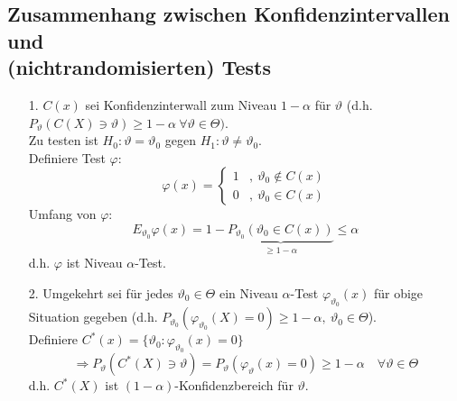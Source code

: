 \documentclass[a4paper,11pt,twoside,titlepage]{article}
\begin{document}
\subsection{Zusammenhang zwischen Konfidenzintervallen und\\ (nichtrandomisierten) Tests}%
\begin{itemize}
\item[1. ]$C(x)$ sei Konfidenzinterwall zum Niveau $1-\alpha$ für $\vartheta$ (d.h.\\ $P_\vartheta(C(X)\ni\vartheta)\geq 1-\alpha\ \forall\vartheta\in\Theta)$.\\
Zu testen ist
$H_0:\vartheta=\vartheta_0$ gegen $H_1:\vartheta\neq\vartheta_0$.\\
 Definiere Test $\varphi$:
 $$\varphi(x)=\left\{\begin{matrix}1&,\ \vartheta_0\notin C(x)\\0&,\ \vartheta_0\in C(x)\end{matrix}\right.$$
 Umfang von $\varphi$:\[ E_{\vartheta_0}\varphi(x)=1-\underbrace{P_{\vartheta_0}(\vartheta_0\in C(x))}_{\geq1-\alpha}\leq \alpha\]
 d.h. $\varphi$ ist Niveau $\alpha$-Test.
 \item[2. ]Umgekehrt sei für jedes $\vartheta_0\in\Theta$ ein Niveau $\alpha$-Test $\varphi_{\vartheta_0}(x)$ für
 obige Situation gegeben (d.h. $P_{\vartheta_0}(\varphi_{\vartheta_0}(X)=0)\geq1-\alpha,\ \vartheta_0\in\Theta$).\\
Definiere $C^\ast(x)=\{\vartheta_0:\varphi_{\vartheta_0}(x)=0\}$
\[\Rightarrow P_\vartheta(C^\ast(X)\ni\vartheta)=P_\vartheta(\varphi_\vartheta(x)=0)\geq1-\alpha\quad \forall\vartheta\in\Theta\]
d.h. $C^\ast(X)$ ist $(1-\alpha)$-Konfidenzbereich für $\vartheta$.
\end{itemize}
\end{document}
